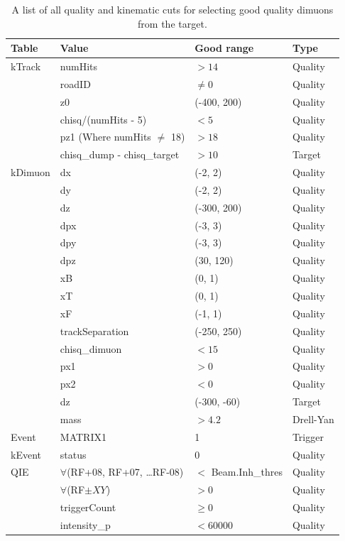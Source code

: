 \begin{table}
	\centering
	\begin{tabular}{@{}llll@{}} \midrule
		\textbf{Table} & \textbf{Value}  & \textbf{Good range} & \textbf{Type} \\ \toprule
		kTrack & numHits & $>14$ & Quality \\
		& roadID & $\neq0$ & Quality \\
		& z0  & (-400, 200)  & Quality \\
		& chisq/(numHits - 5) & $<5$ & Quality \\
		& pz1 (Where numHits $\neq$ 18) & $>18$ & Quality \\
		& chisq\_dump - chisq\_target & $>10$ & Target \\ \midrule
		kDimuon & dx & (-2, 2)  & Quality \\
		& dy & (-2, 2)  & Quality \\
		& dz & (-300, 200)  & Quality \\
		& dpx & (-3, 3)  & Quality \\
		& dpy & (-3, 3)  & Quality \\
		& dpz & (30, 120)  & Quality \\
		& xB & (0, 1)  & Quality \\
		& xT & (0, 1)  & Quality \\
		& xF & (-1, 1)  & Quality \\
		& trackSeparation & (-250, 250)  & Quality \\
		& chisq\_dimuon & $<15$ & Quality \\
		& px1 & $>0$ & Quality \\
		& px2 & $<0$ & Quality \\
		& dz & (-300, -60)  & Target \\
		& mass & $>4.2$ & Drell-Yan \\ \midrule
		Event & MATRIX1 & 1 & Trigger \\ \midrule
		kEvent & status & 0 & Quality \\ \midrule
		QIE & $\forall$(RF+08, RF+07, \ldots RF-08) & $<$ Beam.Inh\_thres & Quality \\
		& $\forall$(RF$\pm XY$) & $>0$ & Quality \\
		& triggerCount & $\geq0$ & Quality \\
		& intensity\_p & $<60000$ & Quality \\
		\bottomrule
	\end{tabular}
	\caption{A list of all quality and kinematic cuts for selecting good quality dimuons from the target.}
	\label{tab:all-other-cuts}
\end{table}

